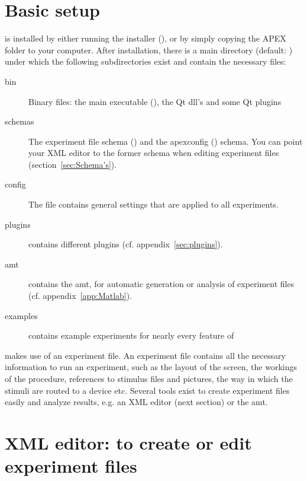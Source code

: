 \section{Basic setup}

\apex is installed by either running the installer (), or by simply copying the APEX folder to your computer. After installation, there is a main
\apex directory (default: ) under
which the following subdirectories exist and contain the necessary
files:

\begin{description}
\item[bin] Binary files: the main \apex executable
(), the Qt dll's and some Qt plugins

\item[schemas] The experiment file schema
() and the apexconfig
() schema. You can point your XML editor
to the former schema when editing experiment files
(section~\ref{sec:Schema's}).

\item[config] The  file contains general
\apex settings that are applied to all experiments.

\item[plugins] contains different plugins (cf.
appendix~\ref{sec:plugins}). 

\item[amt] contains the \ac{amt}, for automatic generation or
analysis of experiment files (cf. appendix~\ref{app:Matlab}). 

\item[examples] contains example experiments for nearly every
feature of \apex
\end{description}


\apex makes use of an experiment file. An experiment file contains
all the necessary information to run an experiment, such as the
layout of the screen, the workings of the procedure, references to
stimulus files and pictures, the way in which the stimuli are
routed to a device etc. Several tools exist to create experiment
files easily and analyze results, e.g. an XML editor (next
section) or the \ac{amt}.

\section{XML editor: to create or edit experiment files}

